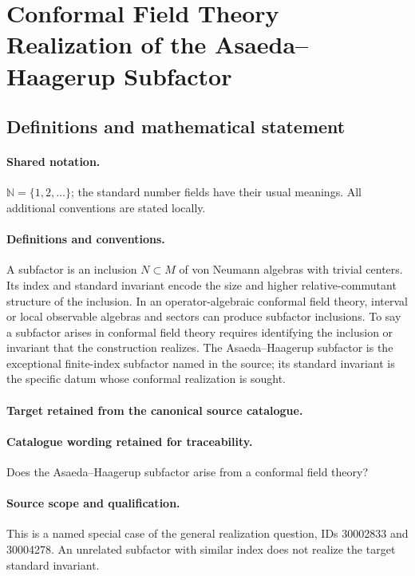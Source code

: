 \documentclass[11pt]{article}
\begin{document}
\section{Conformal Field Theory Realization of the Asaeda–Haagerup Subfactor}\label{statement}

\subsection{Definitions and mathematical statement}

\paragraph{Shared notation.}$\mathbb N=\{1,2,\ldots\}$; the standard number fields have their usual meanings. All additional conventions are stated locally.


\paragraph{Definitions and conventions.}
A subfactor is an inclusion $N\subset M$ of von Neumann algebras with trivial centers. Its index and standard invariant encode the size and higher relative-commutant structure of the inclusion. In an operator-algebraic conformal field theory, interval or local observable algebras and sectors can produce subfactor inclusions. To say a subfactor arises in conformal field theory requires identifying the inclusion or invariant that the construction realizes. The Asaeda--Haagerup subfactor is the exceptional finite-index subfactor named in the source; its standard invariant is the specific datum whose conformal realization is sought.

\paragraph{Target retained from the canonical source catalogue.}
\paragraph{Catalogue wording retained for traceability.}
Does the Asaeda–Haagerup subfactor arise from a conformal field theory?

\paragraph{Source scope and qualification.}
This is a named special case of the general realization question, IDs 30002833 and 30004278. An unrelated subfactor with similar index does not realize the target standard invariant.
\end{document}
